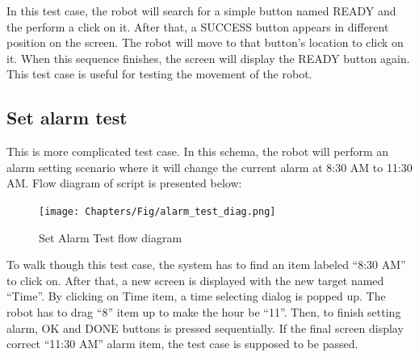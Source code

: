 In this test case, the robot will search for a simple button named READY and the perform a click on it. After that, a SUCCESS button appears in different position on the screen. The robot will move to that button's location to click on it. When this sequence finishes, the screen will display the READY button again.
This test case is useful for testing the movement of the robot.

\subsection{Set alarm test}
This is more complicated test case. In this schema, the robot will perform an alarm setting scenario where it will change the current alarm at 8:30 AM to 11:30 AM. Flow diagram of script is presented below:

	\begin{figure}[H]
		\centering
		\texttt{[image: Chapters/Fig/alarm\_test\_diag.png]}
		\caption{Set Alarm Test flow diagram}
		\label{fig:alarm_test_diag}
	\end{figure}

To walk though this test case, the system has to find an item labeled ``8:30 AM'' to click on. After that, a new screen is displayed with the new target named ``Time''. By clicking on Time item, a time selecting dialog is popped up. The robot has to drag ``8'' item up to make the hour be ``11''. Then, to finish setting alarm, OK and DONE buttons is pressed sequentially. If the final screen display correct ``11:30 AM'' alarm item, the test case is supposed to be passed.